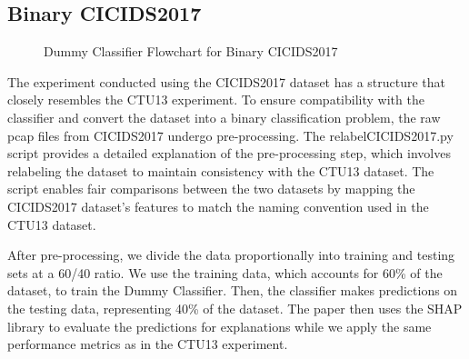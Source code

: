 \subsection{Binary CICIDS2017}\label{subsec:DummyClassifierBinaryCICIDS2017}

\begin{figure}[H]
\centering
{}
\caption{Dummy Classifier Flowchart for Binary CICIDS2017}\label{fig:DummyRandomFlowBinaryCICIDS2017}
\end{figure}

The experiment conducted using the CICIDS2017 dataset has a structure that closely resembles the CTU13 experiment. To ensure compatibility with the classifier and convert the dataset into a binary classification problem, the raw pcap files from CICIDS2017 undergo pre-processing. The relabelCICIDS2017.py script provides a detailed explanation of the pre-processing step, which involves relabeling the dataset to maintain consistency with the CTU13 dataset. The script enables fair comparisons between the two datasets by mapping the CICIDS2017 dataset's features to match the naming convention used in the CTU13 dataset.

After pre-processing, we divide the data proportionally into training and testing sets at a 60/40 ratio. We use the training data, which accounts for 60\% of the dataset, to train the Dummy Classifier. Then, the classifier makes predictions on the testing data, representing 40\% of the dataset. The paper then uses the SHAP library to evaluate the predictions for explanations while we apply the same performance metrics as in the CTU13 experiment.

